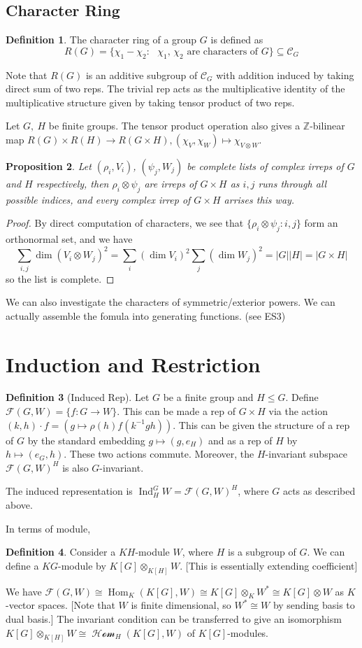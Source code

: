 \documentclass{article}
\theoremstyle{definition}
\newtheorem{defn}{Definition}[section]
\theoremstyle{remark}
\theoremstyle{plain}
\newtheorem{prop}[defn]{Proposition}
\newcommand{\ZZ}{\mathbb{Z}}
\newcommand{\Hom}{\operatorname{Hom}}
\begin{document}
\subsection{Character Ring}
\begin{defn}
    The character ring of a group $G$ is defined as
\[R(G)=\{\chi_1-\chi_2:\text{ $\chi_1$, $\chi_2$ are characters of $G$}\}\subseteq\mathcal{C}_G\]
\end{defn}
Note that $R(G)$ is an additive subgroup of $\mathcal{C}_G$ with addition induced by taking direct sum of two reps. The trivial rep acts as the multiplicative identity of the multiplicative structure given by taking tensor product of two reps.

Let $G,\ H$ be finite groups. The tensor product operation also gives a $\ZZ$-bilinear map
$R(G)\times R(H)\to R(G\times H), (\chi_V,\chi_W)\mapsto \chi_{V\otimes W}$.
\begin{prop}
    Let $(\rho_i,V_i)$, $(\psi_j,W_j)$ be complete lists of complex irreps of $G$ and $H$ respectively, then $\rho_i\otimes\psi_j$ are irreps of $G\times H$ as $i,j$ runs through all possible indices, and every complex irrep of $G\times H$ arrises this way.
\end{prop}
\begin{proof}
    By direct computation of characters, we see that $\{\rho_i\otimes\psi_j:i,j\}$ form an orthonormal set, and we have
    \[\sum_{i,j}\dim(V_i\otimes W_j)^2=\sum_i(\dim V_i)^2\sum_j(\dim W_j)^2=|G||H|=|G\times H|\]
    so the list is complete.
\end{proof}
We can also investigate the characters of symmetric/exterior powers. We can actually assemble the fomula into generating functions. (see ES3)

\section{Induction and Restriction}

\begin{defn}[Induced Rep]
Let $G$ be a finite group and $H\le G$.
Define $\mathcal{F}(G,W)=\{f:G\to W\}$. This can be made a rep of $G\times H$ via the action $(k,h)\cdot f=(g\mapsto \rho(h)f(k^{-1}gh))$. This can be given the structure of a rep of $G$ by the standard embedding $g\mapsto (g,e_H)$ and as a rep of $H$ by $h\mapsto(e_G,h)$. These two actions commute. Moreover, the $H$-invariant subspace $\mathcal{F}(G,W)^H$ is also $G$-invariant.
    
    The induced representation is $\operatorname{Ind}_H^GW=\mathcal{F}(G,W)^H$, where $G$ acts as described above.
\end{defn}
In terms of module,
\begin{defn}
    Consider a $KH$-module $W$, where $H$ is a subgroup of $G$. We can define a $KG$-module by $K[G]\otimes_{K[H]}W$. [This is essentially extending coefficient]
\end{defn}
We have $\mathcal{F}(G,W)\cong \Hom_K(K[G],W)\cong K[G]\otimes_K W^\ast\cong K[G]\otimes W$ as $K$-vector spaces. [Note that $W$ is finite dimensional, so $W^\ast\cong W$ by sending basis to dual basis.] The invariant condition can be transferred to give an isomorphism $K[G]\otimes_{K[H]}W\cong\mathcal{\Hom}_H(K[G],W)$ of $K[G]$-modules.
\end{document}
